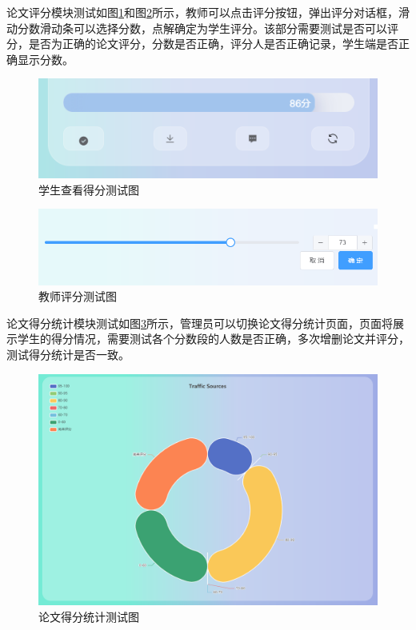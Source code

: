 论文评分模块测试如图\ref{score-student}和图\ref{score-teacher}所示，教师可以点击评分按钮，弹出评分对话框，滑动分数滑动条可以选择分数，点解确定为学生评分。该部分需要测试是否可以评分，是否为正确的论文评分，分数是否正确，评分人是否正确记录，学生端是否正确显示分数。

\begin{figure}[H]
  \centering
  \includegraphics[scale = 0.6]{out/figure/测试/score-student.png}
  \caption{\song\wuhao 学生查看得分测试图}
  \label{score-student}
\end{figure}

\begin{figure}[H]
  \centering
  \includegraphics[scale = 0.6]{out/figure/测试/score-teacher.png}
  \caption{\song\wuhao 教师评分测试图}
  \label{score-teacher}
\end{figure}

论文得分统计模块测试如图\ref{statistic-score-student-test}所示，管理员可以切换论文得分统计页面，页面将展示学生的得分情况，需要测试各个分数段的人数是否正确，多次增删论文并评分，测试得分统计是否一致。

\begin{figure}[H]
  \centering
  \includegraphics[scale = 0.48]{out/figure/测试/statistic-score-student-test.png}
  \caption{\song\wuhao 论文得分统计测试图}
  \label{statistic-score-student-test}
\end{figure}

